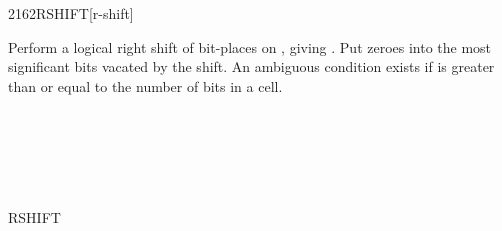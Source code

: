 \begin{worddef}{2162}{RSHIFT}[r-shift]
\item {}

	Perform a logical right shift of  bit-places on
	, giving . Put zeroes into the most
	significant bits vacated by the shift. An ambiguous condition
	exists if  is greater than or equal to the number of
	bits in a cell.

	\begin{testing} %
		 \\
		 \\
		 \\
		 \\
								\tab[7]   \\
		 \tab[1]  RSHIFT  \\
	\end{testing}
\end{worddef}


